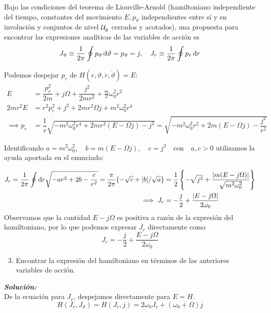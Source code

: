\documentclass{article}
\begin{document}
Bajo las condiciones del teorema de Liouville-Arnold (hamiltoniano independiente del tiempo, constantes del movimiento $E,p_\vartheta$ independientes entre sí y en involución y conjuntos de nivel $\mathcal{U}_g$ cerrados y acotados), una propuesta para encontrar las expresiones analíticas de las variables de acción es 
$$  J_\vartheta\equiv\dfrac{1}{2\pi}\oint p_\vartheta \D{\vartheta}= p_\vartheta = j,   \quad   J_r\equiv\dfrac{1}{2\pi}\oint p_r \D{r}$$

Podemos despejar $p_r$ de $H(r,\vartheta,\dot{r}, \dot{\vartheta})=E$:
\begin{align*}
   E        &=  \dfrac{p_r^2}{2m}+j\Omega+\dfrac{j^2}{2mr^2}+\frac{m}{2} \omega_0^2 r^2 \\
   2mr^2E   &=  r^2p_r^2+j^2+2mr^2\Omega j+m^2\omega_0^2r^4 \\
  \implies  p_r        &=  \dfrac{1}{r}\sqrt{-m^2\omega_0^2r^4 +2mr^2(E-\Omega j)-j^2} = \sqrt{-m^2\omega_0^2r^2 + 2m(E-\Omega j)-\dfrac{j^2}{r^2}}
\end{align*}

Identificando $a=m^2\omega_0^2, \quad b=m(E-\Omega j), \quad c=j^2   \quad \mathrm{con} \quad a,c>0$ utilizamos la ayuda aportada en el enunciado:

\begin{equation*}
\begin{split}
    J_r    = \frac{1}{2\pi} \oint \D{r} \sqrt{-ar^2+2b-\frac{c}{r^2}}=\frac{\pi}{2\pi}\{-\sqrt{c}+|b|/\sqrt{a}\} &= \frac{1}{2}\left \{ -\sqrt{j^2} + \frac{|m(E-j\Omega)|}{\sqrt{m^2\omega_0^2}} \right \}\\
  \implies J_r  &= -\frac{j}{2} + \frac{|E-j\Omega|}{2\omega_0}
\end{split}
\end{equation*}
Observamos que la cantidad $E-j\Omega $ es positiva a razón de la expresión del hamiltoniano, por lo que podemos expresar $J_r $ directamente como
$$
J_r = -\frac{j}{2} + \frac{E-j\Omega}{2\omega_0}
$$
\begin{mybox}
    \begin{enumerate}
    \setcounter{enumi}{2}
        \item Encontrar la expresión del hamiltoniano en términos de las anteriores variables de acción.
    \end{enumerate}
\end{mybox}
\emph{\bfseries Solución:} \\

De la ecuación para $J_r$, despejamos directamente para $E = H$.
$$
H(J_r,J_\vartheta) = H(J_r,j) = 2\omega_0J_r + (\omega_0 + \Omega)j
$$
\end{document}
